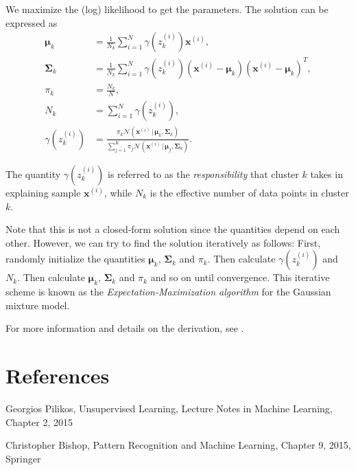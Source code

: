 \documentclass[final,3p,times]{elsarticle}
\begin{document}
We maximize the (log) likelihood to get the parameters. The solution can be expressed as
\begin{equation}
\label{eqn:GMM-solution}
\begin{split}
\boldsymbol{\mu}_k & = \frac{1}{N_k}\sum_{i=1}^N \gamma(z_k^{(i)})\boldsymbol{x}^{(i)},\\
\boldsymbol{\Sigma}_k & = \frac{1}{N_k}\sum_{i=1}^N\gamma(z_k^{(i)})(\boldsymbol{x}^{(i)} - \boldsymbol{\mu}_k)(\boldsymbol{x}^{(i)} - \boldsymbol{\mu}_k)^T,\\
\pi_k & = \frac{N_k}{N},\\
N_k & = \sum_{i=1}^N\gamma(z_k^{(i)}),\\
\gamma(z_k^{(i)}) & = \frac{\pi_k\mathcal{N}(\boldsymbol{x}^{(i)}\,|\,\boldsymbol{\mu}_k,\boldsymbol{\Sigma}_k)}
{\sum_{j=1}^K \pi_j \mathcal{N}(\boldsymbol{x}^{(i)}\,|\,\boldsymbol{\mu}_j,\boldsymbol{\Sigma}_k)}.
\end{split}
\end{equation}

The quantity $\gamma(z_k^{(i)})$ is referred to as the \emph{responsibility} that cluster $k$ takes in explaining sample $\boldsymbol{x}^{(i)}$, while $N_k$ is the effective number of data points in cluster $k$.

Note that this is not a closed-form solution since the quantities depend on each other. However, we can try to find the solution iteratively as follows:
 First, randomly initialize the quantities $\boldsymbol{\mu}_k$, $\boldsymbol{\Sigma}_k$ and $\pi_k$. Then calculate $\gamma(z_k^{(i)})$ and $N_k$. Then calculate $\boldsymbol{\mu}_k$, $\boldsymbol{\Sigma}_k$ and $\pi_k$ and so on until convergence. This iterative scheme is known as the \emph{Expectation-Maximization algorithm} for the Gaussian mixture model. 

For more information and details on the derivation, see \cite{Pilikos} \cite{Bishop}.

\section*{References}


%
%



\begin{thebibliography}{00}

  Georgios Pilikos,
  Unsupervised Learning,
  Lecture Notes in Machine Learning,
  Chapter 2,
  2015

  Christopher Bishop,
  Pattern Recognition and Machine Learning,
  Chapter 9,
  2015,
  Springer
\end{thebibliography}
\end{document}
